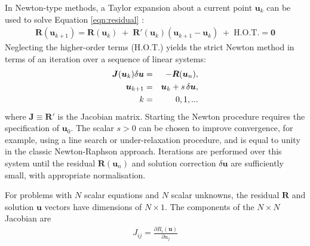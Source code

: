 \documentclass[sn-mathphys,Numbered]{sn-jnl}%
\newcommand{\bb}{\boldsymbol}
\begin{document}
In Newton-type methods, a Taylor expansion about a current point $\bb{u}_k$ can be used to solve Equation \ref{eqn:residual} \cite{Knoll2004}:
\begin{eqnarray}
	\bb{R}(\bb{u}_{k+1}) = \bb{R}(\bb{u}_{k}) \;+\;  \bb{R}'(\bb{u}_{k}) (\bb{u}_{k+1} - \bb{u}_{k}) \;+\; \text{H.O.T.} = \bb{0}
\end{eqnarray}
Neglecting the higher-order terms ($\text{H.O.T.}$) yields the strict Newton method in terms of an iteration over a sequence of linear systems: 
\begin{eqnarray} \label{eq:NewtonRaphson}
	\bb{J}(\bb{u}_k) \delta \bb{u} &=& -\bb{R}(\bb{u}_n), \notag \\
	\bb{u}_{k+1} &=& \bb{u}_k + s \, \delta \bb{u}, \notag \\
	\quad
	k &=& 0,1,...
\end{eqnarray}
where $\bb{J} \equiv \bb{R}'$ is the Jacobian matrix.
Starting the Newton procedure requires the specification of $\bb{u}_0$.
The scalar $s > 0$ can be chosen to improve convergence, for example, using a line search or under-relaxation procedure, and is equal to unity in the classic Newton-Raphson approach.
Iterations are performed over this system until the residual $\bb{R}(\bb{u}_n)$ and solution correction $\delta \bb{u}$ are sufficiently small, with appropriate normalisation.


For problems with $N$ scalar equations and $N$ scalar unknowns, the residual $\bb{R}$ and solution $\bb{u}$ vectors have dimensions of $N \times 1$. %
The components of the $N \times N$ Jacobian are
\begin{eqnarray} \label{eq:J}
	{J}_{ij} = \frac{\partial {R}_i (\bb{u})}{\partial u_j}
\end{eqnarray}
\end{document}

